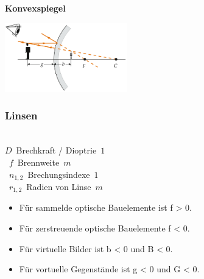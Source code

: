 \textbf{Konvexspiegel}
\begin{center}
	\includegraphics[height=3cm,keepaspectratio=true]{Images/konvexspiegel.png}
\end{center}

\subsubsection{Linsen}

\begin{center}
	\begin{minipage}{0.2\textwidth}
		 \\
		
		\unit{$ D $}{Brechkraft / Dioptrie}{$1$} \\
		\unit{$ f $}{Brennweite}{$m$} \\
		\unit{$ n_{1,2} $}{Brechungsindexe}{$1$} \\
		\unit{$ r_{1,2} $}{Radien von Linse}{$m$} \\
	\end{minipage}%
	\begin{minipage}{0.4\textwidth}
		\begin{itemize}
			\setlength\itemsep{-0.5 em}
			\item Für sammelde optische Bauelemente ist f > 0.
			\item Für zerstreuende optische Bauelemente f < 0.
			\item Für virtuelle Bilder ist b < 0 und B < 0.
			\item Für vortuelle Gegenstände ist g <	0 und G < 0.
		\end{itemize}
	\end{minipage}
\end{center}

